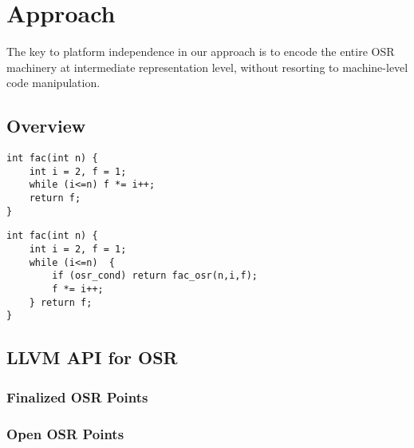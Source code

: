 \section{Approach}
\label{se:approach}

The key to platform independence in our approach is to encode the entire OSR machinery at intermediate representation level, without resorting to machine-level code manipulation.

\subsection{Overview}

\begin{verbatim}
int fac(int n) {
    int i = 2, f = 1;
    while (i<=n) f *= i++;
    return f;
}
\end{verbatim}

\begin{verbatim}
int fac(int n) {
    int i = 2, f = 1;
    while (i<=n)  {
        if (osr_cond) return fac_osr(n,i,f); 
        f *= i++; 
    } return f;
}
\end{verbatim}

\subsection{LLVM API for OSR}

\subsubsection{Finalized OSR Points}

\subsubsection{Open OSR Points}


  
  
  
  
  
  
  
  
  
  
  